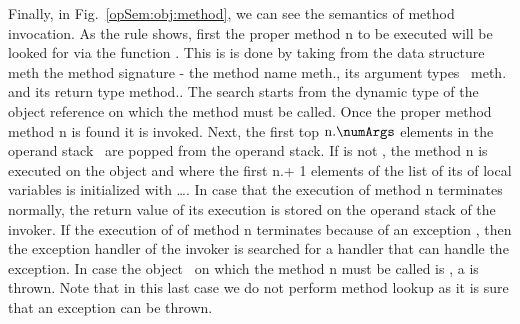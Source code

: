        Finally, in Fig.\ \ref{opSem:obj:method}, we can see the semantics of method invocation. 
       As the rule shows, first the proper method \mbox{\rm n} to be executed will be looked for via the function \lookupOnly. 
       This is is done by taking from the data structure  \mbox{\rm meth} the method signature - the method name \mbox{\rm  meth}.\methodName, 
       its argument types \ \mbox{\rm meth}.\args{}  and its  return type \mbox{\rm method}.\retType. 
       The search starts from the dynamic type of the object reference on which the method must be called.
       Once  the proper method method \mbox{\rm n} is found it is invoked.
      Next, the first top
	  $\mbox{\rm n}.\numArgs$ elements in the operand stack \stackOnly \ are popped from the operand stack. If 
          is not \Mynull, the  method   \mbox{\rm n}  is executed on the object    
	 and where the first \mbox{\rm n}.\numArgs + 1 elements of the list of its of local variables is initialized with 
          \ldots \stackOnlyParam{\counterOnly}. In case that the execution of method \mbox{\rm n}
	 terminates normally, the return value \Res{}  of its execution is stored on the operand stack of the invoker. 
	 If the execution of of method \mbox{\rm n} terminates because of an exception \Exc, then the exception handler of the invoker is searched for
	 a handler that can handle the exception. In case the object   \  on which the  method \mbox{\rm n} must be 
	 called is \Mynull, a \NullPointerExc{} is thrown. Note that in this last case we do not perform method lookup as it is sure that an exception can be thrown.  			


